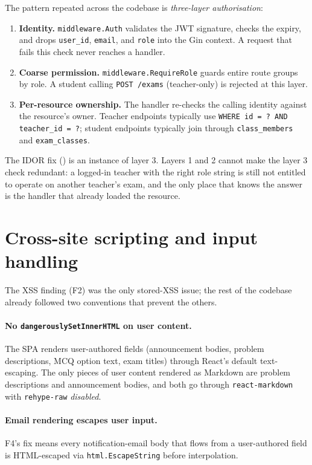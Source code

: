 The pattern repeated across the codebase is \emph{three-layer authorisation}:

\begin{enumerate}
  \item \textbf{Identity.} \texttt{middleware.Auth} validates the JWT signature, checks the expiry, and drops \texttt{user\_id}, \texttt{email}, and \texttt{role} into the Gin context. A request that fails this check never reaches a handler.
  \item \textbf{Coarse permission.} \texttt{middleware.RequireRole} guards entire route groups by role. A student calling \texttt{POST /exams} (teacher-only) is rejected at this layer.
  \item \textbf{Per-resource ownership.} The handler re-checks the calling identity against the resource's owner. Teacher endpoints typically use \texttt{WHERE id = ? AND teacher\_id = ?}; student endpoints typically join through \texttt{class\_members} and \texttt{exam\_classes}.
\end{enumerate}

The IDOR fix () is an instance of layer 3. Layers 1 and 2 cannot make the layer 3 check redundant: a logged-in teacher with the right role string is still not entitled to operate on another teacher's exam, and the only place that knows the answer is the handler that already loaded the resource.

\section{Cross-site scripting and input handling}

The XSS finding (F2) was the only stored-XSS issue; the rest of the codebase already followed two conventions that prevent the others.

\paragraph{No \texttt{dangerouslySetInnerHTML} on user content.} The SPA renders user-authored fields (announcement bodies, problem descriptions, MCQ option text, exam titles) through React's default text-escaping. The only pieces of user content rendered as Markdown are problem descriptions and announcement bodies, and both go through \texttt{react-markdown} with \texttt{rehype-raw} \emph{disabled}.

\paragraph{Email rendering escapes user input.} F4's fix means every notification-email body that flows from a user-authored field is HTML-escaped via \texttt{html.EscapeString} before interpolation.

